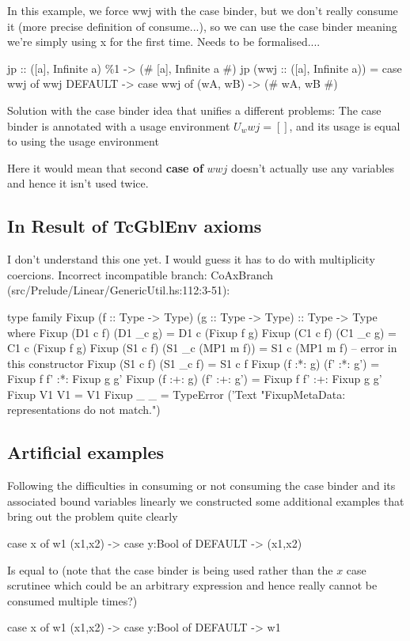 \documentclass[a4paper, draft]{article}
\begin{document}
\begin{code}
In this example, we force wwj with the case binder, but we don't really
consume it (more precise definition of consume...), so we can use the case
binder meaning we're simply using x for the first time. Needs to be
formalised....

\begin{code}
jp :: ([a], Infinite a) \%1 -> (# [a], Infinite a #)
jp (wwj :: ([a], Infinite a)) =
    case wwj of wwj {
        DEFAULT -> case wwj of { (wA, wB) -> (# wA, wB #) }
    }
\end{code}

Solution with the case binder idea that unifies a different problems:
The case binder is annotated with a usage environment $U_wwj = []$, and its
usage is equal to using the usage environment

Here it would mean that second \textbf{case of} $wwj$ doesn't actually use any
variables and hence it isn't used twice.


\subsection{In Result of TcGblEnv axioms}

I don't understand this one yet. I would guess it has to do with multiplicity
coercions. Incorrect incompatible branch: CoAxBranch (src/Prelude/Linear/GenericUtil.hs:112:3-51):
\begin{code}
type family Fixup (f :: Type -> Type) (g :: Type -> Type) :: Type -> Type where
  Fixup (D1 c f) (D1 _c g) = D1 c (Fixup f g)
  Fixup (C1 c f) (C1 _c g) = C1 c (Fixup f g)
  Fixup (S1 c f) (S1 _c (MP1 m f)) = S1 c (MP1 m f) -- error in this constructor
  Fixup (S1 c f) (S1 _c f) = S1 c f
  Fixup (f :*: g) (f' :*: g') = Fixup f f' :*: Fixup g g'
  Fixup (f :+: g) (f' :+: g') = Fixup f f' :+: Fixup g g'
  Fixup V1 V1 = V1
  Fixup _ _ = TypeError ('Text "FixupMetaData: representations do not match.")
\end{code}


\subsection{Artificial examples}

Following the difficulties in consuming or not consuming the case binder and its
associated bound variables linearly we constructed some additional examples that
bring out the problem quite clearly
\begin{code}
case x of w1
    (x1,x2) -> case y:Bool of
                DEFAULT -> (x1,x2)
\end{code}
Is equal to (note that the case binder is being used rather than the $x$ case
scrutinee which could be an arbitrary expression and hence really cannot be
consumed multiple times?)
\begin{code}
case x of w1
    (x1,x2) -> case y:Bool of
                DEFAULT -> w1
\end{code}


\end{code}
\end{document}
